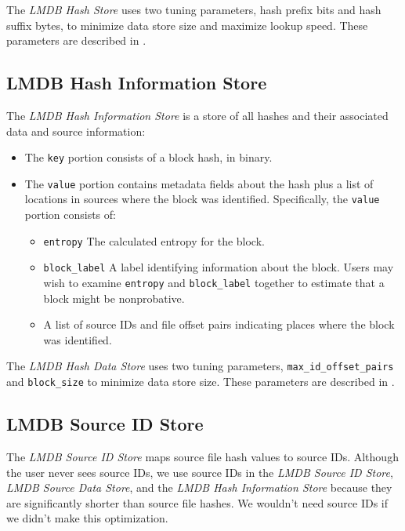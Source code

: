 \documentclass[11pt,fleqn]{article} %
\begin{document}
The \textit{LMDB Hash Store} uses two tuning parameters, hash prefix bits and hash suffix bytes, to minimize data store size and maximize lookup speed.  These parameters are described in \textbf{}.\\


\subsection{LMDB Hash Information Store}
The \textit{LMDB Hash Information Store} is a store of all hashes and their associated data and source information:

\begin{itemize}
\item The \verb+key+ portion consists of a block hash, in binary.
\item The \verb+value+ portion contains metadata fields about the hash plus a list of locations in sources where the block was identified.  Specifically, the \verb+value+ portion consists of:
  \begin{itemize}
  \item \verb+entropy+ The calculated entropy for the block.
  \item \verb+block_label+ A label identifying information about the block.  Users may wish to examine \verb+entropy+ and \verb+block_label+ together to estimate that a block might be nonprobative.
  \item A list of source IDs and file offset pairs indicating places where the block was identified.
  \end{itemize}
\end{itemize}

The \textit{LMDB Hash Data Store} uses two tuning parameters, \verb+max_id_offset_pairs+ and \verb+block_size+ to minimize data store size.  These parameters are described in \textbf{}.\\

\subsection{LMDB Source ID Store}
The \textit{LMDB Source ID Store} maps source file hash values to source IDs.  Although the user never sees source IDs, we use source IDs in the \textit{LMDB Source ID Store}, \textit{LMDB Source Data Store}, and the \textit{LMDB Hash Information Store} because they are significantly shorter than source file hashes.  We wouldn't need source IDs if we didn't make this optimization.
\end{document}
